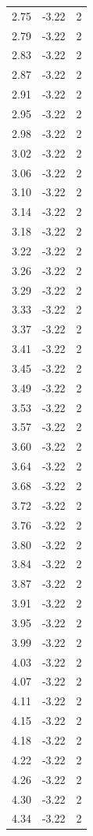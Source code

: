 \begin{longtable}{lrr}
  2.75 & -3.22 & 2 \\
  2.79 & -3.22 & 2 \\
  2.83 & -3.22 & 2 \\
  2.87 & -3.22 & 2 \\
  2.91 & -3.22 & 2 \\
  2.95 & -3.22 & 2 \\
  2.98 & -3.22 & 2 \\
  3.02 & -3.22 & 2 \\
  3.06 & -3.22 & 2 \\
  3.10 & -3.22 & 2 \\
  3.14 & -3.22 & 2 \\
  3.18 & -3.22 & 2 \\
  3.22 & -3.22 & 2 \\
  3.26 & -3.22 & 2 \\
  3.29 & -3.22 & 2 \\
  3.33 & -3.22 & 2 \\
  3.37 & -3.22 & 2 \\
  3.41 & -3.22 & 2 \\
  3.45 & -3.22 & 2 \\
  3.49 & -3.22 & 2 \\
  3.53 & -3.22 & 2 \\
  3.57 & -3.22 & 2 \\
  3.60 & -3.22 & 2 \\
  3.64 & -3.22 & 2 \\
  3.68 & -3.22 & 2 \\
  3.72 & -3.22 & 2 \\
  3.76 & -3.22 & 2 \\
  3.80 & -3.22 & 2 \\
  3.84 & -3.22 & 2 \\
  3.87 & -3.22 & 2 \\
  3.91 & -3.22 & 2 \\
  3.95 & -3.22 & 2 \\
  3.99 & -3.22 & 2 \\
  4.03 & -3.22 & 2 \\
  4.07 & -3.22 & 2 \\
  4.11 & -3.22 & 2 \\
  4.15 & -3.22 & 2 \\
  4.18 & -3.22 & 2 \\
  4.22 & -3.22 & 2 \\
  4.26 & -3.22 & 2 \\
  4.30 & -3.22 & 2 \\
  4.34 & -3.22 & 2 \\

\end{longtable}
